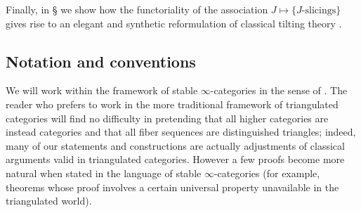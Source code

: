 Finally, in § we show how the functoriality of the association $J\mapsto \{\text{$J$-slicings}\}$ gives rise to an elegant and synthetic reformulation of classical tilting theory \cite{happel}.
{\color{green!40!black}
\subsection{Notation and conventions}
We will work within the framework of stable $\infty$-categories in the sense of \cite{LurieHA}. The reader who prefers to work in the more traditional framework of triangulated categories will find no difficulty in pretending that all higher categories are instead categories and that all fiber sequences are distinguished triangles; indeed, many of our statements and constructions are actually adjustments of classical arguments valid in triangulated categories. However a few proofs become more natural when stated in the language of stable $\infty$-categories (for example, theorems whose proof involves a certain universal property unavailable in the triangulated world).

}
